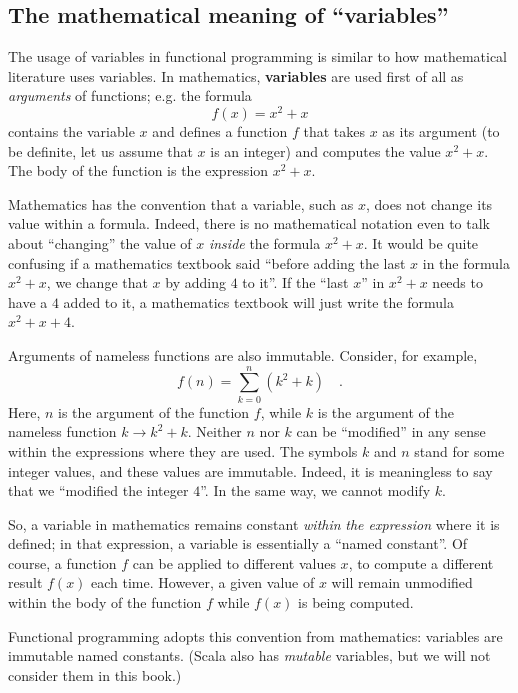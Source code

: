 \subsection{The mathematical meaning of \textsf{``}variables\textsf{''}}

The usage of variables in functional programming is similar to how
mathematical literature uses variables. In mathematics, \textbf{variables}
are used first of all as \emph{arguments} of functions; e.g. the formula
\[
f(x)=x^{2}+x
\]
contains the variable $x$ and defines a function $f$ that takes
$x$ as its argument (to be definite, let us assume that $x$ is an
integer) and computes the value $x^{2}+x$. The body of the function
is the expression $x^{2}+x$. 

Mathematics has the convention that a variable, such as $x$, does
not change its value within a formula. Indeed, there is no mathematical
notation even to talk about \textsf{``}changing\textsf{''} the value of $x$ \emph{inside}
the formula $x^{2}+x$. It would be quite confusing if a mathematics
textbook said \textsf{``}before adding the last $x$ in the formula $x^{2}+x$,
we change that $x$ by adding $4$ to it\textsf{''}. If the \textsf{``}last $x$\textsf{''}
in $x^{2}+x$ needs to have a $4$ added to it, a mathematics textbook
will just write the formula $x^{2}+x+4$.

Arguments of nameless functions are also immutable. Consider, for
example,
\[
f(n)=\sum_{k=0}^{n}(k^{2}+k)\quad.
\]
Here, $n$ is the argument of the function $f$, while $k$ is the
argument of the nameless function $k\rightarrow k^{2}+k$. Neither
$n$ nor $k$ can be \textsf{``}modified\textsf{''} in any sense within the expressions
where they are used. The symbols $k$ and $n$ stand for some integer
values, and these values are immutable. Indeed, it is meaningless
to say that we \textsf{``}modified the integer $4$\textsf{''}. In the same way, we
cannot modify $k$.

So, a variable in mathematics remains constant \emph{within} \emph{the
expression} where it is defined; in that expression, a variable is
essentially a \textsf{``}named constant\textsf{''}. Of course, a function $f$ can
be applied to different values $x$, to compute a different result
$f(x)$ each time. However, a given value of $x$ will remain unmodified
within the body of the function $f$ while $f(x)$ is being computed.

Functional programming adopts this convention from mathematics: variables
are immutable named constants. (Scala also has \emph{mutable} variables,
but we will not consider them in this book.)

